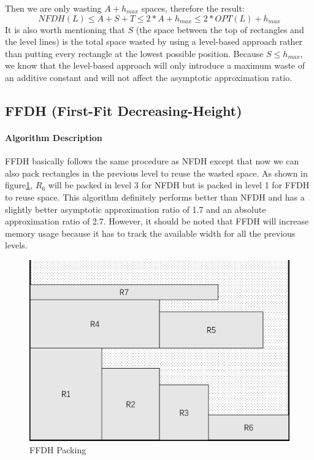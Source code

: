 \documentclass[sigplan,screen,nonacm]{acmart}\settopmatter{printfolios=true,printccs=false,printacmref=false}
\begin{document}
Then we are only wasting $A + h_{max}$ spaces, therefore the result: $$NFDH(L) \leq A+S+T \leq 2*A + h_{max} \leq 2*OPT(L) + h_{max}$$
It is also worth mentioning that $S$ (the space between the top of rectangles and the level lines) is the total space wasted by using a level-based approach rather than putting every rectangle at the lowest possible position. Because $S \leq h_{max}$, we know that the level-based approach will only introduce a maximum waste of an additive constant and will not affect the asymptotic approximation ratio.
\subsection{FFDH (First-Fit Decreasing-Height)}
\paragraph*{Algorithm Description}
FFDH basically follows the same procedure as NFDH except that now we can also pack rectangles in the previous level to reuse the wasted space. As shown in figure\ref{fig:ffdhpacking}, $R_6$ will be packed in level 3 for NFDH but is packed in level 1 for FFDH to reuse space. This algorithm definitely performs better than NFDH and has a slightly better asymptotic approximation ratio of 1.7 and an absolute approximation ratio of 2.7. However, it should be noted that FFDH will increase memory usage because it has to track the available width for all the previous levels.
\begin{figure}[htbp]
  \centering
  \includegraphics[scale=0.4]{ffdh}
  \caption{FFDH Packing}
  \label{fig:ffdhpacking}
\end{figure}
\end{document}
